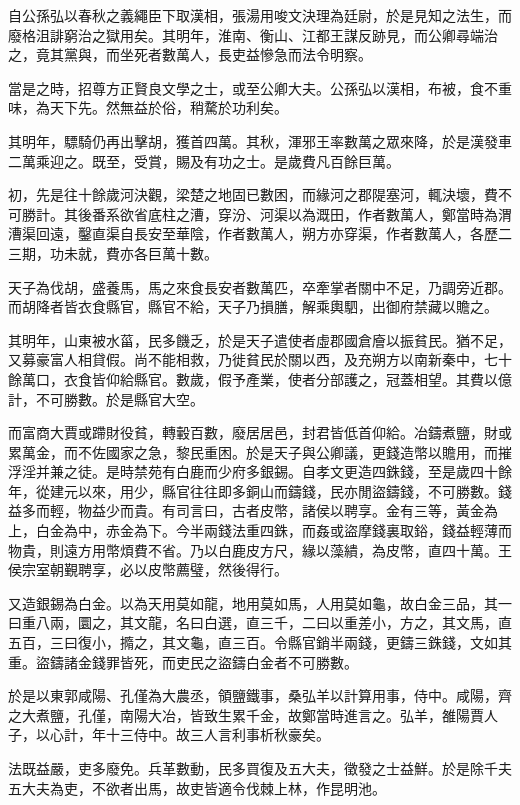 自公孫弘以春秋之義繩臣下取漢相，張湯用唆文決理為廷尉，於是見知之法生，而廢格沮誹窮治之獄用矣。其明年，淮南、衡山、江都王謀反跡見，而公卿尋端治之，竟其黨與，而坐死者數萬人，長吏益慘急而法令明察。

當是之時，招尊方正賢良文學之士，或至公卿大夫。公孫弘以漢相，布被，食不重味，為天下先。然無益於俗，稍騖於功利矣。

其明年，驃騎仍再出擊胡，獲首四萬。其秋，渾邪王率數萬之眾來降，於是漢發車二萬乘迎之。既至，受賞，賜及有功之士。是歲費凡百餘巨萬。

初，先是往十餘歲河決觀，梁楚之地固已數困，而緣河之郡隄塞河，輒決壞，費不可勝計。其後番系欲省底柱之漕，穿汾、河渠以為溉田，作者數萬人，鄭當時為渭漕渠回遠，鑿直渠自長安至華陰，作者數萬人，朔方亦穿渠，作者數萬人，各歷二三期，功未就，費亦各巨萬十數。

天子為伐胡，盛養馬，馬之來食長安者數萬匹，卒牽掌者關中不足，乃調旁近郡。而胡降者皆衣食縣官，縣官不給，天子乃損膳，解乘輿駟，出御府禁藏以贍之。

其明年，山東被水菑，民多饑乏，於是天子遣使者虛郡國倉廥以振貧民。猶不足，又募豪富人相貸假。尚不能相救，乃徙貧民於關以西，及充朔方以南新秦中，七十餘萬口，衣食皆仰給縣官。數歲，假予產業，使者分部護之，冠蓋相望。其費以億計，不可勝數。於是縣官大空。

而富商大賈或蹛財役貧，轉轂百數，廢居居邑，封君皆低首仰給。冶鑄煮鹽，財或累萬金，而不佐國家之急，黎民重困。於是天子與公卿議，更錢造幣以贍用，而摧浮淫并兼之徒。是時禁苑有白鹿而少府多銀錫。自孝文更造四銖錢，至是歲四十餘年，從建元以來，用少，縣官往往即多銅山而鑄錢，民亦閒盜鑄錢，不可勝數。錢益多而輕，物益少而貴。有司言曰，古者皮幣，諸侯以聘享。金有三等，黃金為上，白金為中，赤金為下。今半兩錢法重四銖，而姦或盜摩錢裏取鋊，錢益輕薄而物貴，則遠方用幣煩費不省。乃以白鹿皮方尺，緣以藻繢，為皮幣，直四十萬。王侯宗室朝覲聘享，必以皮幣薦璧，然後得行。

又造銀錫為白金。以為天用莫如龍，地用莫如馬，人用莫如龜，故白金三品，其一曰重八兩，圜之，其文龍，名曰白選，直三千，二曰以重差小，方之，其文馬，直五百，三曰復小，撱之，其文龜，直三百。令縣官銷半兩錢，更鑄三銖錢，文如其重。盜鑄諸金錢罪皆死，而吏民之盜鑄白金者不可勝數。

於是以東郭咸陽、孔僅為大農丞，領鹽鐵事，桑弘羊以計算用事，侍中。咸陽，齊之大煮鹽，孔僅，南陽大冶，皆致生累千金，故鄭當時進言之。弘羊，雒陽賈人子，以心計，年十三侍中。故三人言利事析秋豪矣。

法既益嚴，吏多廢免。兵革數動，民多買復及五大夫，徵發之士益鮮。於是除千夫五大夫為吏，不欲者出馬，故吏皆適令伐棘上林，作昆明池。

